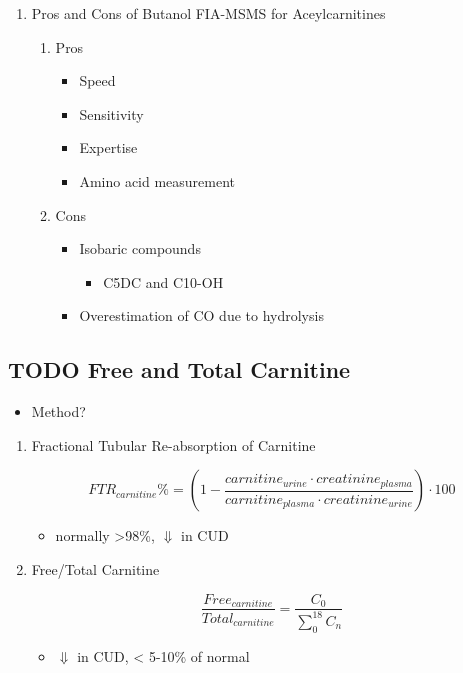 \documentclass{scrartcl}
\begin{document}
\begin{enumerate}
\item Pros and Cons of Butanol  FIA-MSMS for Aceylcarnitines
\label{sec:orgf0fd188}
\begin{enumerate}
\item Pros
\label{sec:org5945338}
\begin{itemize}
\item Speed
\item Sensitivity
\item Expertise
\item Amino acid measurement
\end{itemize}
\item Cons
\label{sec:org2ddc5c6}
\begin{itemize}
\item Isobaric compounds
\begin{itemize}
\item C5DC and C10-OH
\end{itemize}
\item Overestimation of CO due to hydrolysis
\end{itemize}
\end{enumerate}
\end{enumerate}


\subsection{{\bfseries\sffamily TODO} Free and Total Carnitine}
\label{sec:orgf4645d8}
\begin{itemize}
\item Method?
\end{itemize}
\begin{enumerate}
\item Fractional Tubular Re-absorption of Carnitine
\label{sec:org83c4502}

\begin{LaTeX}
\begin{equation*}
FTR_{carnitine}\% = \left( 1 -  \frac{carnitine_{urine} \cdot creatinine_{plasma}}{carnitine_{plasma} \cdot creatinine_{urine}}\right) \cdot 100
\end{equation*}
\end{LaTeX}

\begin{itemize}
\item normally >98\%, \(\Downarrow\) in CUD
\end{itemize}

\item Free/Total Carnitine
\label{sec:org159bc7c}

\[
\frac{Free_{carnitine}}{Total_{carnitine}} = \frac{C_0}{\sum_{0}^{18} C_n}
\]

\begin{itemize}
\item \(\Downarrow\) in CUD, < 5-10\% of normal
\end{itemize}
\end{enumerate}
\end{document}
